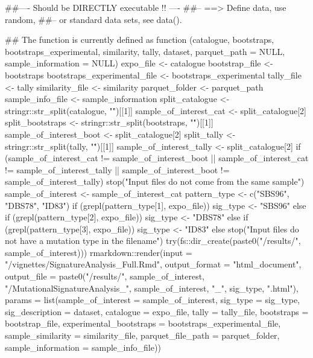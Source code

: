 \documentclass[a4paper]{book}
\begin{document}
\begin{Examples}
\begin{ExampleCode}
##---- Should be DIRECTLY executable !! ----
##-- ==>  Define data, use random,
##--	or standard data sets, see data().

## The function is currently defined as
function (catalogue, bootstraps, bootstraps_experimental, similarity, 
    tally, dataset, parquet_path = NULL, sample_information = NULL) 
{
    expo_file <- catalogue
    bootstrap_file <- bootstraps
    bootstraps_experimental_file <- bootstraps_experimental
    tally_file <- tally
    similarity_file <- similarity
    parquet_folder <- parquet_path
    sample_info_file <- sample_information
    split_catalogue <- stringr::str_split(catalogue, "\.")[[1]]
    sample_of_interest_cat <- split_catalogue[2]
    split_bootstraps <- stringr::str_split(bootstraps, "\.")[[1]]
    sample_of_interest_boot <- split_catalogue[2]
    split_tally <- stringr::str_split(tally, "\.")[[1]]
    sample_of_interest_tally <- split_catalogue[2]
    if (sample_of_interest_cat != sample_of_interest_boot || 
        sample_of_interest_cat != sample_of_interest_tally || 
        sample_of_interest_boot != sample_of_interest_tally) {
        stop("Input files do not come from the same sample")
    }
    sample_of_interest <- sample_of_interest_cat
    pattern_type <- c("SBS96", "DBS78", "ID83")
    if (grepl(pattern_type[1], expo_file)) {
        sig_type <- "SBS96"
    }
    else if (grepl(pattern_type[2], expo_file)) {
        sig_type <- "DBS78"
    }
    else if (grepl(pattern_type[3], expo_file)) {
        sig_type <- "ID83"
    }
    else {
        stop("Input files do not have a mutation type in the filename")
    }
    try(fs::dir_create(paste0("/results/", sample_of_interest)))
    rmarkdown::render(input = "/vignettes/SignatureAnalysis_Full.Rmd", 
        output_format = "html_document", output_file = paste0("/results/", 
            sample_of_interest, "/MutationalSignatureAnalysis_", 
            sample_of_interest, "_", sig_type, ".html"), params = list(sample_of_interest = sample_of_interest, 
            sig_type = sig_type, sig_description = dataset, catalogue = expo_file, 
            tally = tally_file, bootstraps = bootstrap_file, 
            experimental_bootstraps = bootstraps_experimental_file, 
            sample_similarity = similarity_file, parquet_file_path = parquet_folder, 
            sample_information = sample_info_file))
  }
\end{ExampleCode}
\end{Examples}
\end{document}
